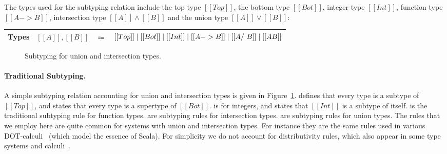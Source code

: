 The types used for the subtyping relation include the top type $[[Top]]$, the bottom type $[[Bot]]$, integer type
$[[Int]]$, function type $[[A -> B]]$, intersection type $[[A]] \wedge
 [[B]]$ and the union type $[[A]] \vee [[B]]$: \\

\begin{center}
\begin{tabular}{lrcl} \toprule
  Types & $[[A]], [[B]]$ & $\Coloneqq$ & $ [[Top]] \mid [[Bot]] \mid [[Int]] \mid [[A -> B]] \mid  [[A /\ B]] \mid [[A \/ B]] $ \\
  \bottomrule
\end{tabular}
\end{center}

\medskip




\begin{figure}[t]
  \begin{small}
    \centering
  \end{small}
  \caption{Subtyping for union and intersection types.}
  \label{fig:traditional_sub}
\end{figure}




\paragraph{Traditional Subtyping.} A simple subtyping relation accounting for union and intersection types
is given in Figure~\ref{fig:traditional_sub}.  defines that every type is a subtype of $[[Top]]$,
and  states that every type is a supertype of $[[Bot]]$.
 is for integers, and states that $[[Int]]$ is a subtype of itself.  is the traditional
subtyping rule for function types.  are subtyping rules for intersection types.
 are subtyping rules for union types.
The rules that we employ here are quite common for systems with union and intersection types.
For instance they are the same rules used in various DOT-calculi~\citep{amin2012dependent}
(which model the essence of Scala). For simplicity we do not account for distributivity rules,
which also appear in some type systems and calculi~\citep{barendregt1983filter,bessai2015typing,zappa2018julia}.


